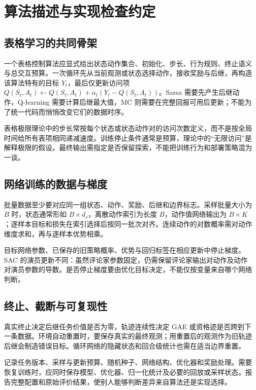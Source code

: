 \setcounter{chapter}{1} %
\chapter{算法描述与实现检查约定}
\label{app:rl-algorithms}

\section{表格学习的共同骨架}

一个表格控制算法应显式给出状态动作集合、初始化、步长、行为规则、终止语义与总交互预算。一次循环先从当前观测或状态选择动作，接收奖励与后继，再构造该算法特有的目标 $Y_t$，最后仅更新访问项 $Q(S_t,A_t)\leftarrow Q(S_t,A_t)+\alpha_t(Y_t-Q(S_t,A_t))$。Sarsa 需要先产生后继动作，Q-learning 需要计算后继最大值，MC 则需要在完整回报可用后更新；不能为了统一代码而悄悄改变它们的数据时序。

表格极限理论中的步长常按每个状态或状态动作对的访问次数定义，而不是按全局时间给所有表项相同递减速度。训练停止条件通常是预算，理论中的“无限访问”是解释极限的假设。最终输出需指定是否保留探索，不能把训练行为和部署策略混为一谈。

\section{网络训练的数据与梯度}

批量数据至少要对应同一组状态、动作、奖励、后继和边界标志。采样批量大小为 $B$ 时，状态通常形如 $B\times d_s$，离散动作索引为长度 $B$，动作值网络输出为 $B\times K$；逐样本目标和损失在索引选择后按同一批次对齐。连续动作的对数概率需对动作维度求和，再与逐样本优势相乘。

目标网络参数、已保存的旧策略概率、优势与回归标签在相应更新中停止梯度。SAC 的演员更新不同：虽然评论家参数固定，仍需保留评论家输出对动作及动作对演员参数的导数。是否停止梯度要由优化目标决定，不能仅按变量来自哪个网络判断。

\section{终止、截断与可复现性}

真实终止决定后继任务价值是否为零，轨迹连续性决定 GAE 或资格迹是否跨到下一条数据。环境自动重置时，要保存真实的最终观测；用重置后的观测作为旧轨迹后继会制造错误目标。循环网络的隐藏状态和回合级统计也需在适当边界重置。

记录任务版本、采样与更新预算、随机种子、网络结构、优化器和奖励处理。需要恢复训练时，应同时保存模型、优化器、归一化统计及必要的回放或采样状态。报告完整配置和原始评价结果，使别人能够判断差异来自算法还是实现选择。





